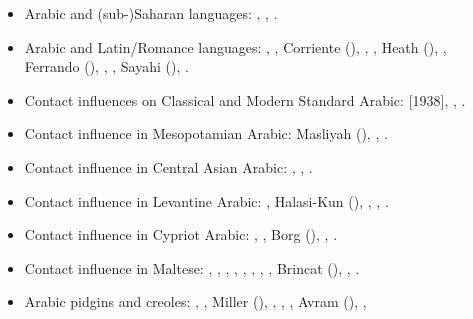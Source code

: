 \documentclass[output=paper]{langsci/langscibook}
\begin{document}
\begin{itemize}[noitemsep,leftmargin=11pt]
\item[\adfhalfrightarrowhead]Arabic and (sub-)Saharan languages: \citet{Owens2000article,Owens2015,Owens2016idioms}, \citet{OwensHassan2004}, \citet{Souag2013lexical,Souag2016sahara}.

\item[\adfhalfrightarrowhead]Arabic and Latin/Romance languages: \citet{Brunot1949}, \citet{Benoliel1977}, Corriente (\citeyear{Corriente1978,Corriente1992chapter,Corriente1992book,Corriente2000,Corriente2005,Corriente2008}), \citet{Talmoudi1986}, \citet{Abdu1988}, Heath (\citeyear{Heath1989,Heath1999,Heath2015}), \citet{Cifoletti1994}, Ferrando (\citeyear{Ferrando1995,Ferrando1997}), \citet{OuldMohamedBaba2003}, \citet{Vicente2006}, Sayahi
(\citeyear{Sayahi2011,Sayahi2014,Sayahi2015}), \citet{Danna2018phonetic}.

\item[\adfhalfrightarrowhead]Contact influences on Classical and Modern Standard Arabic: \citet{Jeffrey2007} [1938], \citet{Blau1969}, \citet{Hebbo1984}.

\item[\adfhalfrightarrowhead]Contact influence in Mesopotamian Arabic: Masliyah (\citeyear{Masliyah1996,Masliyah1997}), \citet{MatrasShabibi2007}, \citet{ElZarkaZiagos2019}.

\item[\adfhalfrightarrowhead]Contact influence in Central Asian Arabic: \citet{Jastrow2005}, \citet{Ratcliffe2005}, \citet{Ingham2011afg}.

\item[\adfhalfrightarrowhead]Contact influence in Levantine Arabic: \citet{Barbot1961}, Halasi-Kun (\citeyear{Halasi-Kun1969,Halasi-Kun1973,Halasi-Kun1982}), \citet{Hopkins1995}, \citet{Contini1999}, \citet{Neishtadt2015}.

\item[\adfhalfrightarrowhead]Contact influence in Cypriot Arabic: \citet{Newton1964}, \citet{Tsiapera1964}, Borg (\citeyear{Borg1985,Borg1997CMA,Borg2004}), \citet{Roth2004}, \citet{Gulle2016}.

\item[\adfhalfrightarrowhead]Contact influence in Maltese: \citet{colin1957}, \citet{Aquilina1958}, \citet{krier1976}, \citet{Drewes1994}, \citet{mifsudloanverbs}, \citet{stolz2003}, \citet{vella2003}, \citet{bovingdondalli2006}, Brincat (\citeyear{brincat1996,brincat2011}), \citet{comriespagnol2016},  \citet{Souag2018berber}.

\item[\adfhalfrightarrowhead]Arabic pidgins and creoles: \citet{Owens1985}, \citet{BurengVincent1986}, Miller (\citeyear{Miller1989,Miller1993}), \citet{Nakao2012}, \citet{Luffin2014}, \citet{Manfredi2014relex}, Avram (\citeyear{Avram2017article,Avram2019}), \citet{Bizri2018}, \citet{Owens2018}


\end{itemize}
\end{document}
